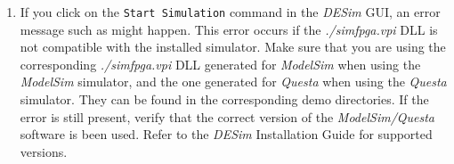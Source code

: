 \begin{enumerate}
\item If you click on the \texttt{Start Simulation} command in the {\it DESim} GUI,
an error message such as  might happen.
This error occurs if the {\it ./simfpga.vpi} DLL is not compatible with the installed simulator.
Make sure that you are using the corresponding {\it ./simfpga.vpi} DLL generated for 
{\it ModelSim} when using the {\it ModelSim} simulator, and the one generated for
{\it Questa} when using the {\it Questa} simulator. They can be found in the corresponding
demo directories. If the error is still present, verify that the correct version of the
{\it ModelSim/Questa} software is been used. Refer to the {\it DESim} Installation
Guide for supported versions.
\end{enumerate}





